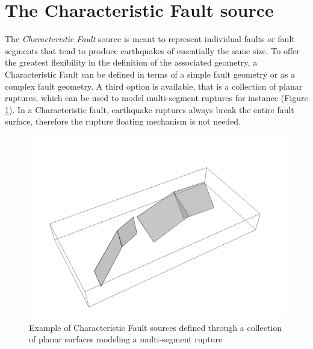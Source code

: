 \section{The Characteristic Fault source}
The \textit{Characteristic Fault} source is meant to represent individual faults
or fault segments that tend to produce earthquakes
\parencite{schwartscoppersmith1984} of essentially the same size. To offer the
greatest flexibility in the definition of the associated geometry, a
Characteristic Fault can be defined in terms of a simple fault geometry or as a
complex fault geometry. A third option is available, that is a collection of
planar ruptures, which can be used to model multi-segment ruptures for
instance (Figure \ref{fig:CharacteristicFaultSource}). In a Characteristic
fault, earthquake ruptures always break the entire fault surface, therefore the
rupture floating mechanism is not needed.  
\begin{figure}
\centering
\includegraphics[width=14cm]{./Pictures/CharacteristicFaultSource.pdf}
\caption{Example of Characteristic Fault sources defined through a collection of
planar surfaces modeling a multi-segment rupture}
\label{fig:CharacteristicFaultSource}
\end{figure}
